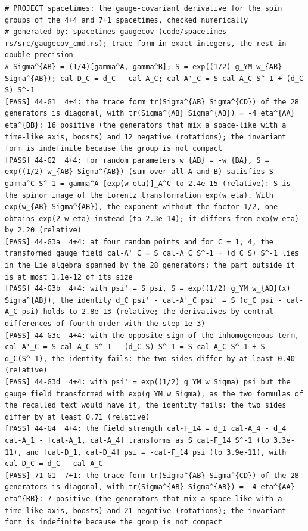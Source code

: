 \documentclass[
  10pt,
]{article}
\begin{document}
\begin{verbatim}
# PROJECT spacetimes: the gauge-covariant derivative for the spin groups of the 4+4 and 7+1 spacetimes, checked numerically
# generated by: spacetimes gaugecov (code/spacetimes-rs/src/gaugecov_cmd.rs); trace form in exact integers, the rest in double precision
# Sigma^{AB} = (1/4)[gamma^A, gamma^B]; S = exp((1/2) g_YM w_{AB} Sigma^{AB}); cal-D_C = d_C - cal-A_C; cal-A'_C = S cal-A_C S^-1 + (d_C S) S^-1
[PASS] 44-G1  4+4: the trace form tr(Sigma^{AB} Sigma^{CD}) of the 28 generators is diagonal, with tr(Sigma^{AB} Sigma^{AB}) = -4 eta^{AA} eta^{BB}: 16 positive (the generators that mix a space-like with a time-like axis, boosts) and 12 negative (rotations); the invariant form is indefinite because the group is not compact
[PASS] 44-G2  4+4: for random parameters w_{AB} = -w_{BA}, S = exp((1/2) w_{AB} Sigma^{AB}) (sum over all A and B) satisfies S gamma^C S^-1 = gamma^A [exp(w eta)]_A^C to 2.4e-15 (relative): S is the spinor image of the Lorentz transformation exp(w eta). With exp(w_{AB} Sigma^{AB}), the exponent without the factor 1/2, one obtains exp(2 w eta) instead (to 2.3e-14); it differs from exp(w eta) by 2.20 (relative)
[PASS] 44-G3a  4+4: at four random points and for C = 1, 4, the transformed gauge field cal-A'_C = S cal-A_C S^-1 + (d_C S) S^-1 lies in the Lie algebra spanned by the 28 generators: the part outside it is at most 1.1e-12 of its size
[PASS] 44-G3b  4+4: with psi' = S psi, S = exp((1/2) g_YM w_{AB}(x) Sigma^{AB}), the identity d_C psi' - cal-A'_C psi' = S (d_C psi - cal-A_C psi) holds to 2.8e-13 (relative; the derivatives by central differences of fourth order with the step 1e-3)
[PASS] 44-G3c  4+4: with the opposite sign of the inhomogeneous term, cal-A'_C = S cal-A_C S^-1 - (d_C S) S^-1 = S cal-A_C S^-1 + S d_C(S^-1), the identity fails: the two sides differ by at least 0.40 (relative)
[PASS] 44-G3d  4+4: with psi' = exp((1/2) g_YM w Sigma) psi but the gauge field transformed with exp(g_YM w Sigma), as the two formulas of the recalled text would have it, the identity fails: the two sides differ by at least 0.71 (relative)
[PASS] 44-G4  4+4: the field strength cal-F_14 = d_1 cal-A_4 - d_4 cal-A_1 - [cal-A_1, cal-A_4] transforms as S cal-F_14 S^-1 (to 3.3e-11), and [cal-D_1, cal-D_4] psi = -cal-F_14 psi (to 3.9e-11), with cal-D_C = d_C - cal-A_C
[PASS] 71-G1  7+1: the trace form tr(Sigma^{AB} Sigma^{CD}) of the 28 generators is diagonal, with tr(Sigma^{AB} Sigma^{AB}) = -4 eta^{AA} eta^{BB}: 7 positive (the generators that mix a space-like with a time-like axis, boosts) and 21 negative (rotations); the invariant form is indefinite because the group is not compact

\end{verbatim}
\end{document}
